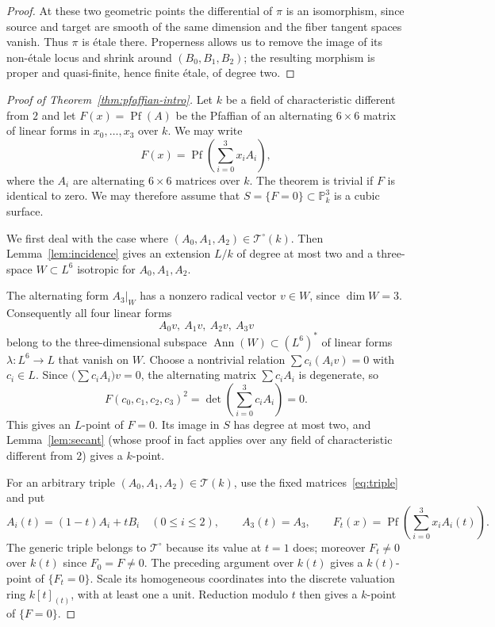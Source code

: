 \documentclass[a4paper,11pt]{amsart}
\numberwithin{equation}{section}
\theoremstyle{definition}
\theoremstyle{remark}
\newcommand{\PP}{\mathbb P}
\newcommand{\CP}{\PP}
\DeclareMathOperator{\Pf}{Pf}
\DeclareMathOperator{\Ann}{Ann}
\newcommand{\cT}{\mathcal T}
\begin{document}
\begin{proof}
At these two geometric points the differential of $\pi$ is an
isomorphism, since source and target are smooth of the same dimension
and the fiber tangent spaces vanish. Thus $\pi$ is \'etale 
there. Properness allows us to remove the image of its non-\'etale
locus and shrink around $(B_0,B_1,B_2)$; the resulting morphism is
proper and quasi-finite, hence finite \'etale, of degree two.
\end{proof}

\begin{proof}[Proof of Theorem~\ref{thm:pfaffian-intro}]
Let $k$ be a field of characteristic different from $2$
and let $F(x)=\Pf(A)$ be the Pfaffian of an alternating $6\times 6$ matrix of linear forms in $x_0,\dots ,x_3$ over $k$.
We may write
\[
 F(x)=\Pf\!\left(\sum_{i=0}^3x_iA_i\right),
\]
where the $A_i$ are alternating $6\times 6$ matrices over $k$. 
The theorem is trivial if $F$ is identical to zero.
We may therefore assume that $S=\{F=0\}\subset \CP^3_k$ is a cubic surface. 

We first deal with the case where 
$(A_0,A_1,A_2)\in\cT^\circ(k)$. Then Lemma~\ref{lem:incidence} gives
an extension $L/k$ of degree at most two and a three-space
$W\subset L^6$ isotropic for $A_0,A_1,A_2$.

The alternating form $A_3|_W$ has a nonzero radical vector $v\in W$,
since $\dim W=3$. Consequently all four linear forms %
\[
 A_0v,\ A_1v,\ A_2v,\ A_3v
\]
belong to the three-dimensional subspace $\Ann(W)\subset(L^6)^*$ 
of linear forms $\lambda\colon L^6\to L$ that vanish on $W$.
Choose a nontrivial relation $\sum c_i (A_i v)=0$ with $c_i\in L$. Since $\bigl(\sum c_i A_i\bigr) v=0$, 
the alternating matrix $\sum c_iA_i$ is 
degenerate, 
so
\[
 F(c_0,c_1,c_2,c_3)^2
   =\det\!\left(\sum_{i=0}^3c_iA_i\right)=0.
\]
This gives an $L$-point of $F=0$. Its image in $S$ has degree at most two,
and Lemma~\ref{lem:secant} (whose proof in fact applies over any field of 
characteristic different from $2$) gives a $k$-point.

For an arbitrary triple $(A_0,A_1,A_2)\in\cT(k)$, 
use the fixed matrices~\eqref{eq:triple} and
put
\[
 A_i(t)=(1-t)A_i+tB_i\quad(0\le i\le2),
 \qquad A_3(t)=A_3,
 \qquad F_t(x)=\Pf\!\left(\sum_{i=0}^3x_iA_i(t)\right).
\]
The generic triple belongs to $\cT^\circ$ because its value at $t=1$
does; moreover $F_t\ne0$ over $k(t)$ since $F_0=F\ne0$.
The preceding argument over $k(t)$ gives a $k(t)$-point of $\{F_t=0\}$.
Scale its homogeneous coordinates into the discrete valuation ring
$k[t]_{(t)}$, with at least one a unit. Reduction modulo $t$ then gives
a $k$-point of $\{F=0\}$.
\end{proof}
\end{document}
